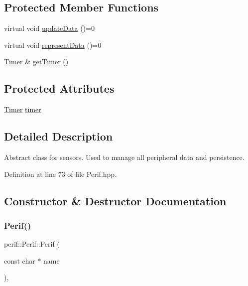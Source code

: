 \subsection*{Protected Member Functions}
\begin{DoxyCompactItemize}
\item 
virtual void \mbox{\hyperlink{classperif_1_1Perif_a7c9b9c1af5300dc5c007f9559fefbffe}{update\+Data}} ()=0
\item 
virtual void \mbox{\hyperlink{classperif_1_1Perif_a556c780e9e4623aa6b7c3d167ef23e6b}{represent\+Data}} ()=0
\item 
\mbox{\hyperlink{classTimer}{Timer}} \& \mbox{\hyperlink{classperif_1_1Perif_a29c48598a861d85256c30e28af67f864}{get\+Timer}} ()
\end{DoxyCompactItemize}
\subsection*{Protected Attributes}
\begin{DoxyCompactItemize}
\item 
\mbox{\hyperlink{classTimer}{Timer}} \mbox{\hyperlink{classperif_1_1Perif_acfa1256201bead82ccce1a0a8bcc24e1}{timer}}
\end{DoxyCompactItemize}


\subsection{Detailed Description}
Abstract class for sensors. Used to manage all peripheral data and persistence. 

Definition at line 73 of file Perif.\+hpp.



\subsection{Constructor \& Destructor Documentation}
\mbox{\label{classperif_1_1Perif_a8e0c30d9aeb9069e3c1a1aa2db672b62}} 
\subsubsection{\texorpdfstring{Perif()}{Perif()}\hspace{0.1cm}{\footnotesize\ttfamily [1/2]}}
{\footnotesize\ttfamily perif\+::\+Perif\+::\+Perif (\begin{DoxyParamCaption}\item[{const char $\ast$}]{name }\end{DoxyParamCaption})\hspace{0.3cm}{\ttfamily [inline]}, {\ttfamily [explicit]}}

